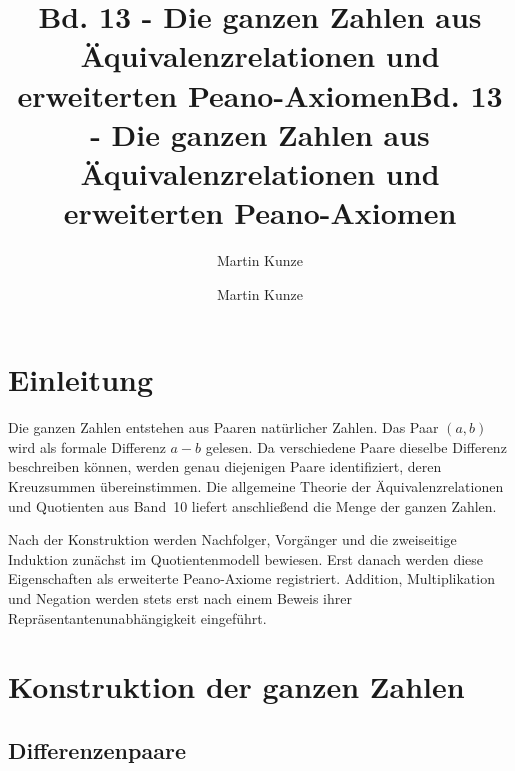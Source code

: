 \documentclass[main.tex]{subfiles}
\title{Bd. 13 - Die ganzen Zahlen aus Äquivalenzrelationen und erweiterten Peano-Axiomen}
\author{Martin Kunze}
\date{}
\begin{document}
\title{Bd. 13 - Die ganzen Zahlen aus Äquivalenzrelationen und erweiterten Peano-Axiomen}
\author{Martin Kunze}
\date{}
\hypersetup{pageanchor=false}
\maketitle
\hypersetup{pageanchor=true}
\setcounter{tocdepth}{3}
\tableofcontents
\setcounter{file}{13}
\renewcommand{\FormulaBandID}{13}

\chapter{Einleitung}

Die ganzen Zahlen entstehen aus Paaren natürlicher Zahlen. Das Paar
\((a,b)\) wird als formale Differenz \(a-b\) gelesen. Da verschiedene Paare
dieselbe Differenz beschreiben können, werden genau diejenigen Paare
identifiziert, deren Kreuzsummen übereinstimmen. Die allgemeine Theorie der
Äquivalenzrelationen und Quotienten aus Band~10 liefert anschließend die
Menge der ganzen Zahlen.

Nach der Konstruktion werden Nachfolger, Vorgänger und die zweiseitige
Induktion zunächst im Quotientenmodell bewiesen. Erst danach werden diese
Eigenschaften als erweiterte Peano-Axiome registriert. Addition,
Multiplikation und Negation werden stets erst nach einem Beweis ihrer
Repräsentantenunabhängigkeit eingeführt.

\chapter{Konstruktion der ganzen Zahlen}

\section{Differenzenpaare}



\end{document}
